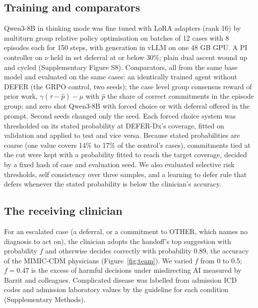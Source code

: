 \documentclass[11pt]{article}
\begin{document}
\subsection*{Training and comparators}
Qwen3-8B\cite{qwen3} in thinking mode was fine tuned with LoRA adapters\cite{lora} (rank 16) by multiturn group relative policy optimisation\cite{grpo} on batches of 12 cases with 8 episodes each for 150 steps, with generation in vLLM\cite{vllm} on one 48 GB GPU. A PI controller on $\nu$ held in set deferral at or below 30\%; plain dual ascent wound up and cycled (Supplementary Figure S8). Comparators, all from the same base model and evaluated on the same cases: an identically trained agent without DEFER (the GRPO control, two seeds); the case level group consensus reward of prior work\cite{tiar,karl,awarl}, $\gamma(\tau - \hat p) - \mu$ with $\hat p$ the share of correct commitments in the episode group; and zero shot Qwen3-8B with forced choice or with deferral offered in the prompt. Second seeds changed only the seed. Each forced choice system was thresholded on its stated probability at DEFER-Dx's coverage, fitted on validation and applied to test and vice versa. Because stated probabilities are coarse (one value covers 14\% to 17\% of the control's cases), commitments tied at the cut were kept with a probability fitted to reach the target coverage, decided by a fixed hash of case and evaluation seed. We also evaluated selective risk thresholds\cite{geifman2017}, self consistency over three samples, and a learning to defer rule that defers whenever the stated probability is below the clinician's accuracy\cite{mozannar2020,madras2018,dvijotham2023}.

\subsection*{The receiving clinician}
For an escalated case (a deferral, or a commitment to OTHER, which names no diagnosis to act on), the clinician adopts the handoff's top suggestion with probability $f$ and otherwise decides correctly with probability 0.89, the accuracy of the MIMIC-CDM physicians\cite{hager2024} (Figure~\ref{fig:team}). We varied $f$ from 0 to 0.5; $f = 0.47$ is the excess of harmful decisions under misdirecting AI measured by Barrit and colleagues\cite{barrit2026}. Complicated disease was labelled from admission ICD codes and admission laboratory values by the guideline for each condition\cite{wses2020app,wses2020div,atlanta2012,tokyo2018} (Supplementary Methods).
\end{document}
